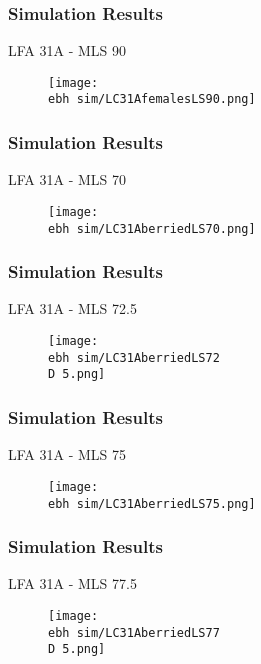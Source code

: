 \documentclass{beamer}
\newcommand{\ebh}{\string~/bio.data/bio.lobster/figures/LFA2733Framework2018/} %
\newcommand{\D}{.}
\begin{document}
\begin{frame}
\frametitle{Simulation Results}
LFA 31A - MLS 90
\begin{figure}
        \begin{center}
            \texttt{[image: \\ebh sim/LC31AfemalesLS90.png]}
        \end{center}
    \end{figure}
\end{frame}




\begin{frame}
\frametitle{Simulation Results}
LFA 31A - MLS 70
\begin{figure}
        \begin{center}
            \texttt{[image: \\ebh sim/LC31AberriedLS70.png]}
        \end{center}
    \end{figure}
\end{frame}


\begin{frame}
\frametitle{Simulation Results}
LFA 31A - MLS 72.5
\begin{figure}
        \begin{center}
            \texttt{[image: \\ebh sim/LC31AberriedLS72\\D 5.png]}
        \end{center}
    \end{figure}
\end{frame}


\begin{frame}
\frametitle{Simulation Results}
LFA 31A - MLS 75
\begin{figure}
        \begin{center}
            \texttt{[image: \\ebh sim/LC31AberriedLS75.png]}
        \end{center}
    \end{figure}
\end{frame}


\begin{frame}
\frametitle{Simulation Results}
LFA 31A - MLS 77.5
\begin{figure}
        \begin{center}
            \texttt{[image: \\ebh sim/LC31AberriedLS77\\D 5.png]}
        \end{center}
    \end{figure}
\end{frame}
\end{document}

